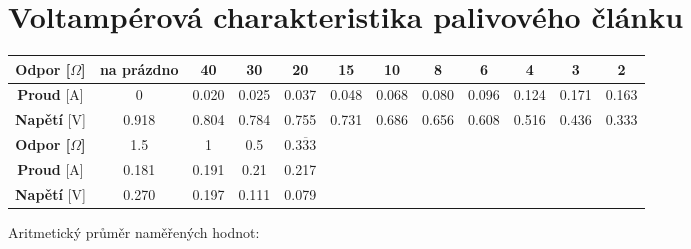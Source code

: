 \documentclass[11pt, a4paper]{report}
\begin{document}
\section{Voltampérová charakteristika palivového článku}

\begin{center}
	\renewcommand{\arraystretch}{1.5}
	\begin{table}[h]
		\centering
		\begin{tabular}{|c|c|c|c|c|c|c|c|c|c|c|c|}

			\hline
			\textbf{Odpor [$\Omega$]} & na prázdno & 40    & 30    & 20                 & 15    & 10    & 8     & 6     & 4     & 3     & 2     \\

			\hline
			\textbf{Proud} [A]        & 0          & 0.020 & 0.025 & 0.037              & 0.048 & 0.068 & 0.080 & 0.096 & 0.124 & 0.171 & 0.163 \\
			\hline

			\hline
			\textbf{Napětí} [V]       & 0.918      & 0.804 & 0.784 & 0.755              & 0.731 & 0.686 & 0.656 & 0.608 & 0.516 & 0.436 & 0.333 \\
			\hline
			\hline
			\hline
			\textbf{Odpor [$\Omega$]} & 1.5        & 1     & 0.5   & 0.$\overline{333}$ &       &       &       &       &       &       &       \\

			\hline
			\textbf{Proud} [A]        & 0.181      & 0.191 & 0.21  & 0.217              &       &       &       &       &       &       &       \\

			\hline
			\textbf{Napětí} [V]       & 0.270      & 0.197 & 0.111 & 0.079              &       &       &       &       &       &       &       \\
  \hline
		\end{tabular}
	\end{table}


\end{center}
\clearpage
\noindent Aritmetický průměr naměřených hodnot: \newline
\end{document}
